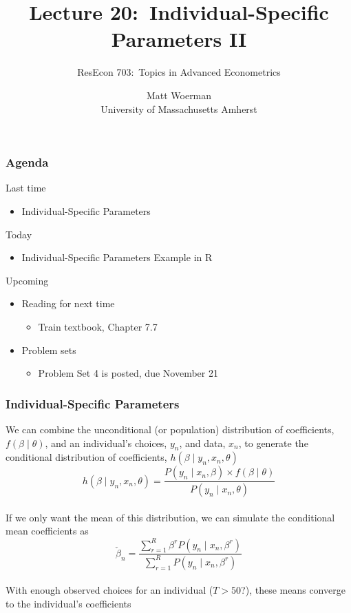 \documentclass{beamer}\usepackage[]{graphicx}\usepackage[]{color}
\title[Lecture 20:\ Individual-Specific Parameters II]{Lecture 20:\ Individual-Specific Parameters II}
\author[ResEcon 703:\ Advanced Econometrics]{ResEcon 703:\ Topics in Advanced Econometrics}
\date{Matt Woerman\\University of Massachusetts Amherst}
\begin{document}
{ 
\begin{frame}[noframenumbering]
    \titlepage
\end{frame}
}

\begin{frame}\frametitle{Agenda}
    Last time
    \begin{itemize}
        \item Individual-Specific Parameters
    \end{itemize}
    \vspace{2ex}
    Today
    \begin{itemize}
        \item Individual-Specific Parameters Example in R
    \end{itemize}
    \vspace{2ex}
    Upcoming
    \begin{itemize}
        \item Reading for next time
        \begin{itemize}
            \item Train textbook, Chapter 7.7
        \end{itemize}
        \item Problem sets
        \begin{itemize}
            \item Problem Set 4 is posted, due November 21
        \end{itemize}
    \end{itemize}
\end{frame}

\begin{frame}\frametitle{Individual-Specific Parameters}
    We can combine the unconditional (or population) distribution of coefficients, $f(\beta \mid \theta)$, and an individual's choices, $y_n$, and data, $x_n$, to generate the conditional distribution of coefficients, $h(\beta \mid y_n, x_n, \theta)$
    $$h(\beta \mid y_n, x_n, \theta) = \frac{P(y_n \mid x_n, \beta) \times f(\beta \mid \theta)}{P(y_n \mid x_n, \theta)}$$ \\
    \vspace{2ex}
    If we only want the mean of this distribution, we can simulate the conditional mean coefficients as
    $$\check{\beta}_n = \frac{\sum_{r = 1}^R \beta^r P(y_n \mid x_n, \beta^r)}{\sum_{r = 1}^R P(y_n \mid x_n, \beta^r)}$$ \\
    \vspace{2ex}
    With enough observed choices for an individual ($T > 50$?), these means converge to the individual's coefficients
\end{frame}
\end{document}
